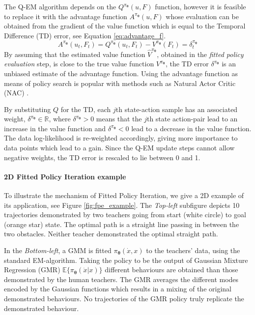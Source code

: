 \documentclass[final,5p,times,twocolumn]{elsarticle}
\newcommand{\X}{x}
\newcommand{\U}{\dot{x}}
\newcommand{\Param}{\boldsymbol{\theta}}
\begin{document}
The Q-EM algorithm depends on the $Q^{\pi_{\Param}}(u,F)$ function, however it is feasible to replace it with the 
advantage function $A^{\pi_{\Param}}(u,F)$ whose evaluation can be obtained from the gradient of the value function 
which is equal to the Temporal Difference (TD) error, see Equation \ref{eq:advantage_f}.
\begin{equation}\label{eq:advantage_f}
 A^{\pi_{\Param}}(u_t,F_t) =  Q^{\pi_{\Param}}(u_t,F_t) - V^{\pi_{\Param}}(F_t) = \delta^{\pi_{\Param}}_t
\end{equation}
By assuming that the estimated value function $\hat{V}^{\pi_{\Param}}$, obtained in the \textit{fitted policy evaluation} step, 
is close to the true value function $V^{\pi_{\Param}}$, the TD error $\delta^{\pi_{\Param}}$ is an unbiased estimate of the advantage function. Using the 
advantage function as means of policy search is popular with methods such as Natural Actor Critic (NAC) \cite{peter_nac_2008}.

By substituting $Q$ for the TD, each $j$th state-action sample has an associated weight, $\delta^{\pi_{\Param}} \in \mathbb{R}$, 
where $\delta^{\pi_{\Param}} > 0$ means that the 
$j$th state action-pair lead to an increase in the value function and $\delta^{\pi_{\Param}} < 0$ lead to 
a decrease in the value function. The data log-likelihood is re-weighted accordingly, giving more importance to data points which lead to a gain. Since 
the Q-EM update steps cannot allow negative weights, the TD error is rescaled to lie between 0 and 1. 


\paragraph{2D Fitted Policy Iteration example}

To illustrate the mechanism of Fitted Policy Iteration, we give a 2D example 
of its application, see Figure \ref{fig:fpe_example}. The \textit{Top-left} subfigure
depicts 10 trajectories demonstrated by two teachers going from start (white circle) to goal (orange star) state. 
The optimal path is a straight line passing in between the two obstacles. 
Neither teacher demonstrated the optimal straight path. 

In the \textit{Bottom-left}, a GMM is fitted $\pi_{\Param}(\U,\X)$ to the teachers' data, using the standard EM-algorithm.
Taking the policy to be the output of Gaussian Mixture Regression (GMR) $\mathbb{E}\{\pi_{\Param}(\U|\X)\}$ different
behaviours are obtained than those demonstrated by the human teachers. The GMR averages the different modes encoded by the Gaussian functions 
which results in a mixing of the original demonstrated behaviours. No trajectories of the GMR policy truly replicate 
the demonstrated behaviour. 
\end{document}
